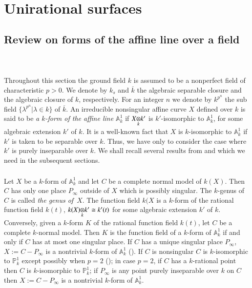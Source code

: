 \chapter{Unirational surfaces}\label{chap3}

\section{Review on forms of the affine line 
over a field}\label{chap3:chap3-sec1}\pageoriginale\

\subsection{}\label{chap3:1.1}
Throughout this section the ground field $k$ is assumed to be a
nonperfect field of characteristic $p>0$. We denote by $k_{s}$ and
$\overline{k}$ the algebraic separable closure and the algebraic
closure of $k$, respectively. For an integer $n$ we denote by
$k^{p^{n}}$ the sub field $\{\lambda^{p^{n}}|\lambda\in k\}$ of
$\overline{k}$. An irreducible nonsingular affine curve $X$ defined
over $k$ is said to be {\em a $k$-form of the affine line
  $\mathbb{A}^{1}_{k}$} if $\foprod{X}{k'}{k}$ is $k'$-isomorphic to
$\mathbb{A}^{1}_{k}$, for some algebraic extension $k'$ of $k$. It is
a well-known fact that $X$ is $k$-isomorphic to $\mathbb{A}^{1}_{k}$
if $k'$ is taken to be separable over $k$. Thus, we have only to
consider the case where $k'$ is purely inseparable over $k$. We shall
recall several results from \cite{26} and \cite{27} which we need in
the subsequent sections. 

\subsection{}\label{chap3:1.2}
Let $X$ be a $k$-form of $\mathbb{A}^{1}_{k}$ and let $C$ be a
complete normal model of $k(X)$. Then $C$ has only one place
$P_{\infty}$ outside of $X$ which is possibly singular. The $k$-genus
of $C$ is called {\em the genus of}\pageoriginale\ $X$. The function
field $k(X$ is a $k$-form of the rational function field $k(t)$, \iec
$\foprod{k(X)}{k'\cong k'(t)}{k}$  for some algebraic extension $k'$
of $k$. Conversely, given a $k$-form $K$ of the rational function
field $k(t)$, let $C$ be a complete $k$-normal model. Then $K$ is the
function field of a $k$-form of $\mathbb{A}^{1}_{k}$ if and only if
$C$ has at most one singular place. If $C$ has a unique singular place
$P_{\infty}$, $X:=C-P_{\infty}$ is a nontrivial $k$-form of
$\mathbb{A}^{1}_{k}$ (\cf [26; 6.7]). If $C$ is nonsingular $C$ is
$k$-isomorphic to $\mathbb{P}^{1}_{k}$ except possibly when $p=2$ (\cf
[ibid., 6.7.7]); in case $p=2$, if $C$ has a $k$-rational point then
$C$ is $k$-isomorphic to $\mathbb{P}^{1}_{k}$; if $P_{\infty}$ is any
point purely inseparable over $k$ on $C$ then $X:=C-P_{\infty}$ is a
nontrivial $k$-form of $\mathbb{A}^{1}_{k}$.

